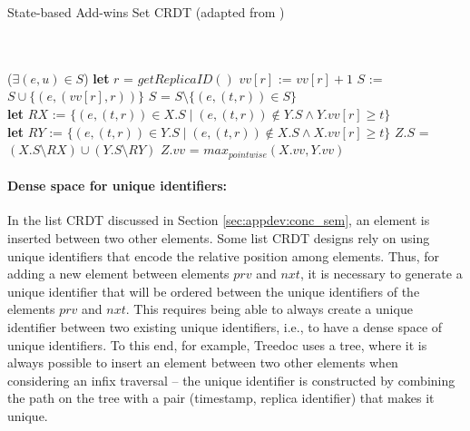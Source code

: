 \documentclass[12pt]{article}
\newcommand{\Let}{\textbf{let} }
\begin{document}
\begin{algorithm}
\caption{State-based Add-wins Set CRDT (adapted from \cite{Bieniusa12Optimized})}
\label{alg:st:addwins}
\begin{algorithmic}[1]
 \\
\\
\EndPayload
{}
\State \Return ($\exists (e,u) \in S$)
\EndQuery
{}
\State \Let $r$ = $\mathit{getReplicaID}()$
\State $\mathit{vv}[r]$ := $\mathit{vv}[r] + 1$ 
\State $S$ := $S \cup \{(e,(\mathit{vv}[r],r))\}$ 
\EndUpdate
{}
\State $S$ = $S \setminus \{(e,(t,r)) \in S\}$
\EndUpdate
{}\\
\State \Let $\mathit{RX}$ := $\{(e,(t,r)) \in X.S \mid (e,(t,r)) \not \in Y.S \wedge Y.\mathit{vv}[r] \geq t\}$\\
\State \Let $\mathit{RY}$ := $\{(e,(t,r)) \in Y.S \mid (e,(t,r)) \not \in X.S \wedge X.\mathit{vv}[r] \geq t\}$
\State $Z.S$ = $(X.S \setminus \mathit{RX}) \cup (Y.S \setminus \mathit{RY})$ 
\State $Z.\mathit{vv}$ = $\mathit{max}_{\mathit{pointwise}}(X.\mathit{vv},Y.\mathit{vv})$ 
\EndMerge
\end{algorithmic}
\end{algorithm}

\paragraph{Dense space for unique identifiers:}
In the list CRDT discussed in Section \ref{sec:appdev:conc_sem}, an element is inserted
between two other elements. 
Some list CRDT designs \cite{Preguica09Commutative,Weiss09Logoot} rely on using 
unique identifiers that encode the relative position among elements. Thus, for 
adding a new element between elements $prv$ and $nxt$, it is necessary to generate 
a unique identifier that will be ordered between the unique identifiers of the 
elements $prv$ and $nxt$. 
This requires being able to always create a unique identifier between two existing 
unique identifiers, i.e., to have a dense space of unique identifiers.
To this end, for example, Treedoc \cite{Preguica09Commutative} uses a tree, where it is always 
possible to insert an element between two other elements when considering an infix 
traversal -- the unique identifier is constructed by combining the path on the tree 
with a pair (timestamp, replica identifier) that makes it unique.
\end{document}
